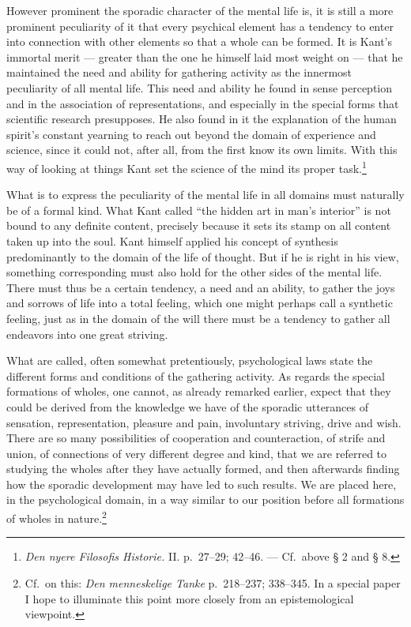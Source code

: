 \documentclass[12pt]{book}
\newcommand{\opage}[1]{\marginnote{\footnotesize\textit{[#1]}}}
\begin{document}
\opage{76}However prominent the sporadic character of the mental life is, it is
still a more prominent peculiarity of it that every psychical element has a tendency
to enter into connection with other elements so that a whole can be formed. It is
Kant's immortal merit --- greater than the one he himself laid most weight on --- that
he maintained the need and ability for gathering activity as the innermost
peculiarity of all mental life. This need and ability he found in sense perception and
in the association of representations, and especially in the special forms that
scientific research presupposes. He also found in it the explanation of the human
spirit's constant yearning to reach out beyond the domain of experience and science,
since it could not, after all, from the first know its own limits. With this way of
looking at things Kant set the science of the mind its proper task.\footnote{\textit{Den
nyere Filosofis Historie.} II. p.~27--29; 42--46. --- Cf.\ above § 2 and § 8.}

What is to express the peculiarity of the mental life in all domains must naturally
be of a formal kind. What Kant called ``the hidden art in man's interior'' is not
bound to any definite content, precisely because it sets its stamp on all content
taken up into the soul. Kant himself applied his concept of synthesis predominantly to
the domain of the life of thought. But if he is right in his view, something
corresponding must also hold for the other sides of the mental life. There must thus
be a certain tendency, a need and an ability, to gather the joys and sorrows of life
into a total feeling, which one might perhaps call a synthetic feeling, just as in the
domain of the will there must be a tendency to gather all endeavors into one great
striving.

What are called, often somewhat pretentiously, psychological laws state the different
forms and conditions of the gathering activity. As regards the special formations of
wholes, \opage{77}one cannot, as already remarked earlier, expect that they could be
derived from the knowledge we have of the sporadic utterances of sensation,
representation, pleasure and pain, involuntary striving, drive and wish. There are so
many possibilities of cooperation and counteraction, of strife and union, of
connections of very different degree and kind, that we are referred to studying the
wholes after they have actually formed, and then afterwards finding how the sporadic
development may have led to such results. We are placed here, in the psychological
domain, in a way similar to our position before all formations of wholes in
nature.\footnote{Cf.\ on this: \textit{Den menneskelige Tanke} p.~218--237;
338--345. In a special paper I hope to illuminate this point more closely from an
epistemological viewpoint.}
\end{document}
